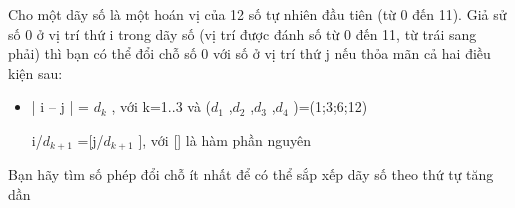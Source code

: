 Cho một dãy số là một hoán vị của 12 số tự nhiên đầu tiên (từ 0 đến 11). Giả sử số 0 ở vị trí thứ i trong dãy số (vị trí được đánh số từ 0 đến 11, từ trái sang phải) thì bạn có thể đổi chỗ số 0 với số ở vị trí thứ j nếu thỏa mãn cả hai điều kiện sau:  
\begin{itemize}
	\item     | i – j | = $d_{k}$    , với k=1..3 và ($d_{1}$    ,$d_{2}$    ,$d_{3}$    ,$d_{4}$    )=(1;3;6;12)    


	\item     [i/$d_{k+1}$    ]=[j/$d_{k+1}$    ], với [] là hàm phần nguyên   
\end{itemize}

   Bạn hãy tìm số phép đổi chỗ ít nhất để có thể sắp xếp dãy số theo thứ tự tăng dần